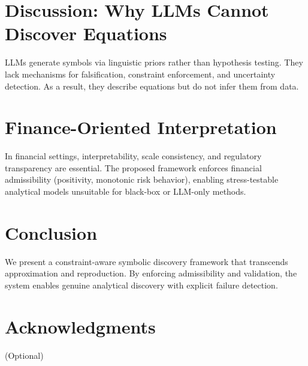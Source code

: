 \documentclass[11pt]{article}
\begin{document}
\section{Discussion: Why LLMs Cannot Discover Equations}
LLMs generate symbols via linguistic priors rather than hypothesis testing. They lack mechanisms for falsification, constraint enforcement, and uncertainty detection. As a result, they describe equations but do not infer them from data.

\section{Finance-Oriented Interpretation}
In financial settings, interpretability, scale consistency, and regulatory transparency are essential. The proposed framework enforces financial admissibility (positivity, monotonic risk behavior), enabling stress-testable analytical models unsuitable for black-box or LLM-only methods.

\section{Conclusion}
We present a constraint-aware symbolic discovery framework that transcends approximation and reproduction. By enforcing admissibility and validation, the system enables genuine analytical discovery with explicit failure detection.

\section*{Acknowledgments}
(Optional)



\end{document}
